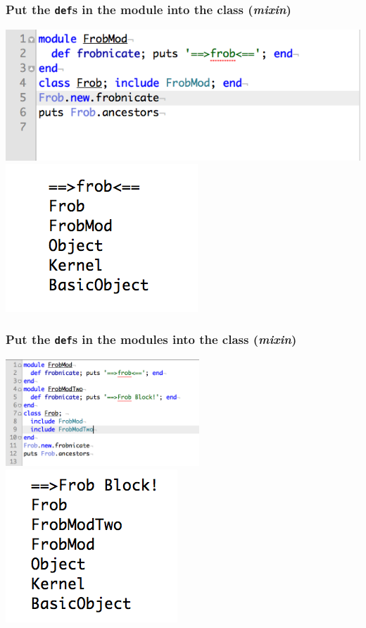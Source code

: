 \documentclass[slidestop,compress,mathserif]{beamer}
\begin{document}
\begin{frame}
	\frametitle{Put the \texttt{def}s in the module into the class (\emph{mixin})}
	\includegraphics[scale=0.45,scaleY=0.8]{img/frob_mixin.png} \\
	\vskip 0.25cm
	\includegraphics[scale=0.45]{img/frob_mixin_output.png}		
\end{frame}

\begin{frame}
	\frametitle{Put the \texttt{def}s in the module\textbf{s} into the class (\emph{mixin})}
	\includegraphics[scale=0.45,height=4cm]{img/frob_double_mod.png} \\
	\vskip 0.20cm
	\includegraphics[scale=0.45]{img/frob_double_mod_output.png}		
\end{frame}
\end{document}
